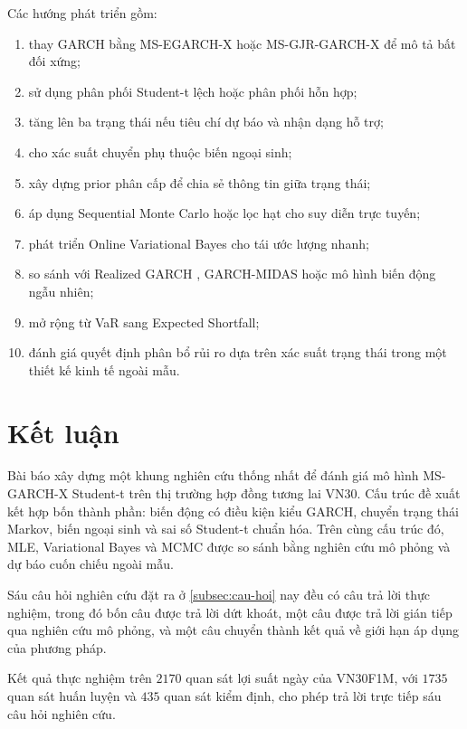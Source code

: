 \documentclass[12pt,a4paper]{article}
\numberwithin{equation}{section}
\begin{document}
Các hướng phát triển gồm:
\begin{enumerate}
  \item thay GARCH bằng MS-EGARCH-X \cite{nelson1991} hoặc MS-GJR-GARCH-X \cite{glosten1993} để mô tả bất đối xứng;
  \item sử dụng phân phối Student-t lệch hoặc phân phối hỗn hợp;
  \item tăng lên ba trạng thái nếu tiêu chí dự báo và nhận dạng hỗ trợ;
  \item cho xác suất chuyển phụ thuộc biến ngoại sinh;
  \item xây dựng prior phân cấp để chia sẻ thông tin giữa trạng thái;
  \item áp dụng Sequential Monte Carlo hoặc lọc hạt cho suy diễn trực tuyến;
  \item phát triển Online Variational Bayes cho tái ước lượng nhanh;
  \item so sánh với Realized GARCH \cite{hansen2012}, GARCH-MIDAS \cite{engle2013} hoặc mô hình biến động ngẫu nhiên;
  \item mở rộng từ VaR sang Expected Shortfall;
  \item đánh giá quyết định phân bổ rủi ro dựa trên xác suất trạng thái trong một thiết kế kinh tế ngoài mẫu.
\end{enumerate}

\section{Kết luận}\label{sec:ket-luan}

Bài báo xây dựng một khung nghiên cứu thống nhất để đánh giá mô hình MS-GARCH-X Student-t trên thị trường hợp đồng tương lai VN30. Cấu trúc đề xuất kết hợp bốn thành phần: biến động có điều kiện kiểu GARCH, chuyển trạng thái Markov, biến ngoại sinh và sai số Student-t chuẩn hóa. Trên cùng cấu trúc đó, MLE, Variational Bayes và MCMC được so sánh bằng nghiên cứu mô phỏng và dự báo cuốn chiếu ngoài mẫu.

Sáu câu hỏi nghiên cứu đặt ra ở \cref{subsec:cau-hoi} nay đều có câu trả lời thực nghiệm, trong đó bốn câu được trả lời dứt khoát, một câu được trả lời gián tiếp qua nghiên cứu mô phỏng, và một câu chuyển thành kết quả về giới hạn áp dụng của phương pháp.

Kết quả thực nghiệm trên $2170$ quan sát lợi suất ngày của VN30F1M, với $1735$ quan sát huấn luyện và $435$ quan sát kiểm định, cho phép trả lời trực tiếp sáu câu hỏi nghiên cứu.
\end{document}

